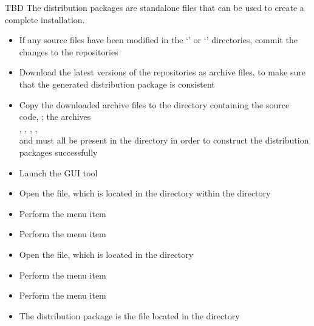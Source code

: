 \tertiaryEnd
{}
TBD
\tertiaryEnd
\secondaryEnd
{}
The distribution packages are standalone files that can be used to create a complete
\mplusm{} installation.
\begin{itemize}
\item If any source files have been modified in the `' or
`' directories, commit the changes to the
 repositories
\item\exSp{}Download the latest versions of the  repositories as 
archive files, to make sure that the generated distribution package is consistent
\item\exSp{}Copy the downloaded  archive files to the directory containing
the \mplusm{} source code, ; the archives\\
, ,
, ,\\
 and  must
all be present in the  directory in order to construct the
distribution packages successfully
\item\exSp{}Launch the  GUI tool
\item\exSp{}Open the  file, which is located in the
 directory within the 
directory
\item\exSp{}Perform the menu item 
\item\exSp{}Perform the menu item 
\item\exSp{}Open the  file, which is located in the
 directory
\item\exSp{}Perform the menu item 
\item\exSp{}Perform the menu item 
\item\exSp{}The distribution package is the  file located in the
 directory
\end{itemize}
\tertiaryEnd
{}
